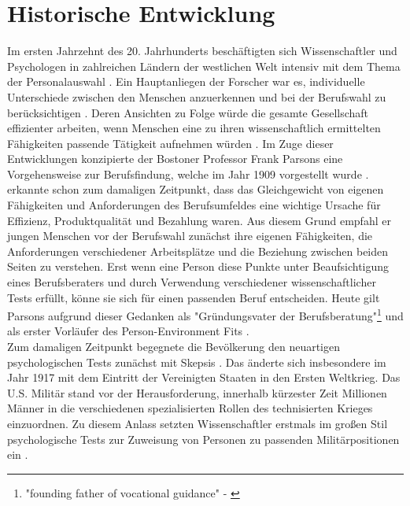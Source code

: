\section{Historische Entwicklung}
\label{ch:personEnvironmentFit:historisches}
Im ersten Jahrzehnt des 20. Jahrhunderts beschäftigten sich Wissenschaftler und Psychologen in zahlreichen Ländern der westlichen Welt intensiv mit dem Thema der Personalauswahl \cite[S. 1]{salgado:2001}. Ein Hauptanliegen der Forscher war es, individuelle Unterschiede zwischen den Menschen anzuerkennen und bei der Berufswahl zu berücksichtigen \cite[S. 2ff.]{stern:1900}. Deren Ansichten zu Folge würde die gesamte Gesellschaft effizienter arbeiten, wenn Menschen eine zu ihren wissenschaftlich ermittelten Fähigkeiten passende Tätigkeit aufnehmen würden \cite[S.2]{kevles:1968}\cite[S. 3]{parsons:1909}. Im Zuge dieser Entwicklungen konzipierte der Bostoner Professor Frank Parsons eine Vorgehensweise zur Berufsfindung, welche im Jahr 1909 vorgestellt wurde \cite[S. 1]{su:2015}. \textcite[S. 5ff.]{parsons:1909} erkannte schon zum damaligen Zeitpunkt, dass das Gleichgewicht von eigenen Fähigkeiten und Anforderungen des Berufsumfeldes eine wichtige Ursache für Effizienz, Produktqualität und Bezahlung waren. Aus diesem Grund empfahl er jungen Menschen vor der Berufswahl zunächst ihre eigenen Fähigkeiten, die Anforderungen verschiedener Arbeitsplätze und die Beziehung zwischen beiden Seiten zu verstehen. Erst wenn eine Person diese Punkte unter Beaufsichtigung eines Berufsberaters und durch Verwendung verschiedener wissenschaftlicher Tests erfüllt, könne sie sich für einen passenden Beruf entscheiden. Heute gilt Parsons aufgrund dieser Gedanken als "Gründungsvater der Berufsberatung"\footnote{"founding father of vocational guidance" - \textcite[S. 3, Z. 29]{porfeli:2009}} \cite[S. 3, Z. 29]{porfeli:2009} und als erster Vorläufer des Person-Environment Fits \cite[S. 2]{edwards:2008}.\\
Zum damaligen Zeitpunkt begegnete die Bevölkerung den neuartigen psychologischen Tests zunächst mit Skepsis \cite[S. 2]{kevles:1968}. Das änderte sich insbesondere im Jahr 1917 mit dem Eintritt der Vereinigten Staaten in den Ersten Weltkrieg. Das U.S. Militär stand vor der Herausforderung, innerhalb kürzester Zeit Millionen Männer in die verschiedenen spezialisierten Rollen des technisierten Krieges einzuordnen. Zu diesem Anlass setzten Wissenschaftler erstmals im großen Stil psychologische Tests zur Zuweisung von Personen zu passenden Militärpositionen ein \cite[S. 2ff.]{kevles:1968}. \\
